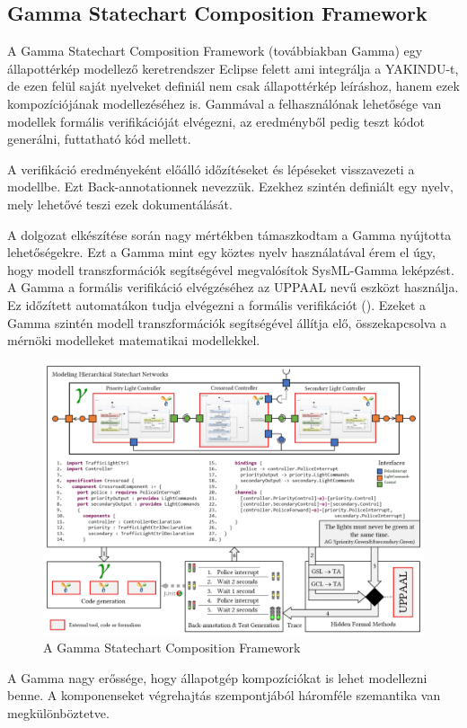 \subsection{Gamma Statechart Composition Framework}

A Gamma Statechart Composition Framework (továbbiakban Gamma) egy állapottérkép modellező keretrendszer Eclipse felett ami integrálja a YAKINDU-t, de ezen felül saját nyelveket definiál nem csak állapottérkép leíráshoz, hanem ezek kompozíciójának modellezéséhez is. Gammával a felhasználónak lehetősége van modellek formális verifikációját elvégezni, az eredményből pedig teszt kódot generálni, futtatható kód mellett.

A verifikáció eredményeként előálló időzítéseket és lépéseket visszavezeti a modellbe. Ezt Back-annotationnek nevezzük. Ezekhez szintén definiált egy nyelv, mely lehetővé teszi ezek dokumentálását.

A dolgozat elkészítése során nagy mértékben támaszkodtam a Gamma nyújtotta lehetőségekre. Ezt a Gamma mint egy köztes nyelv használatával érem el úgy, hogy modell transzformációk segítségével megvalósítok SysML-Gamma leképzést. A Gamma a formális verifikáció elvégzéséhez az UPPAAL nevű eszközt használja. Ez időzített automatákon tudja elvégezni a formális verifikációt (). Ezeket a Gamma szintén modell transzformációk segítségével állítja elő, összekapcsolva a mérnöki modelleket matematikai modellekkel.
\begin{figure}[!ht]
	\centering
	\includegraphics[width=140mm, keepaspectratio]{figures/preliminaries/gamma.png}
	\caption[]{A Gamma Statechart Composition Framework\footnotemark}
	\label{fig:gamma}
\end{figure}
\newpage
A Gamma nagy erőssége, hogy állapotgép kompozíciókat is lehet modellezni benne. A komponenseket végrehajtás szempontjából háromféle szemantika van megkülönböztetve.

